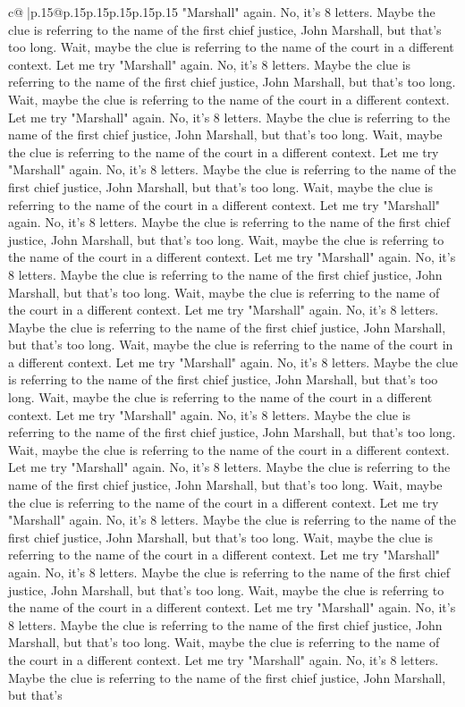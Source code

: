 \documentclass{article}
\begin{document}
{\begin{supertabular}{c@{$\;$}|p{.15\linewidth}@{}p{.15\linewidth}p{.15\linewidth}p{.15\linewidth}p{.15\linewidth}p{.15\linewidth}}
{{{"Marshall" again. No, it's 8 letters. Maybe the clue is referring to the name of the first chief justice, John Marshall, but that's too long. Wait, maybe the clue is referring to the name of the court in a different context. Let me try "Marshall" again. No, it's 8 letters. Maybe the clue is referring to the name of the first chief justice, John Marshall, but that's too long. Wait, maybe the clue is referring to the name of the court in a different context. Let me try "Marshall" again. No, it's 8 letters. Maybe the clue is referring to the name of the first chief justice, John Marshall, but that's too long. Wait, maybe the clue is referring to the name of the court in a different context. Let me try "Marshall" again. No, it's 8 letters. Maybe the clue is referring to the name of the first chief justice, John Marshall, but that's too long. Wait, maybe the clue is referring to the name of the court in a different context. Let me try "Marshall" again. No, it's 8 letters. Maybe the clue is referring to the name of the first chief justice, John Marshall, but that's too long. Wait, maybe the clue is referring to the name of the court in a different context. Let me try "Marshall" again. No, it's 8 letters. Maybe the clue is referring to the name of the first chief justice, John Marshall, but that's too long. Wait, maybe the clue is referring to the name of the court in a different context. Let me try "Marshall" again. No, it's 8 letters. Maybe the clue is referring to the name of the first chief justice, John Marshall, but that's too long. Wait, maybe the clue is referring to the name of the court in a different context. Let me try "Marshall" again. No, it's 8 letters. Maybe the clue is referring to the name of the first chief justice, John Marshall, but that's too long. Wait, maybe the clue is referring to the name of the court in a different context. Let me try "Marshall" again. No, it's 8 letters. Maybe the clue is referring to the name of the first chief justice, John Marshall, but that's too long. Wait, maybe the clue is referring to the name of the court in a different context. Let me try "Marshall" again. No, it's 8 letters. Maybe the clue is referring to the name of the first chief justice, John Marshall, but that's too long. Wait, maybe the clue is referring to the name of the court in a different context. Let me try "Marshall" again. No, it's 8 letters. Maybe the clue is referring to the name of the first chief justice, John Marshall, but that's too long. Wait, maybe the clue is referring to the name of the court in a different context. Let me try "Marshall" again. No, it's 8 letters. Maybe the clue is referring to the name of the first chief justice, John Marshall, but that's too long. Wait, maybe the clue is referring to the name of the court in a different context. Let me try "Marshall" again. No, it's 8 letters. Maybe the clue is referring to the name of the first chief justice, John Marshall, but that's too long. Wait, maybe the clue is referring to the name of the court in a different context. Let me try "Marshall" again. No, it's 8 letters. Maybe the clue is referring to the name of the first chief justice, John Marshall, but that's }}}
\end{supertabular}}
\end{document}
